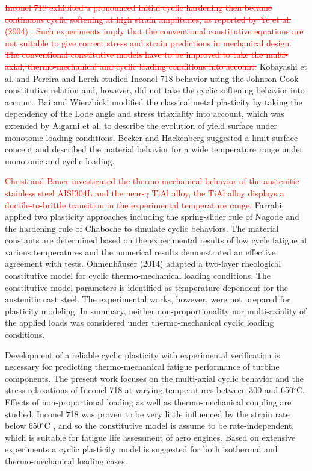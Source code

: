 \documentclass[preprint,5p,twocolumn,11pt,sort&compress]{elsarticle}
\newcommand{\marked}[1]{\textcolor{red}{#1}}
\begin{document}
\marked{\sout{Inconel 718 exhibited a pronounced initial cyclic hardening then became continuous cyclic softening at high strain amplitudes, as reported by  Ye et al. (2004) \cite{ye2004low} . Such experiments imply that the conventional constitutive equations are not suitable to give correct stress and strain predictions in mechanical design. The conventional constitutive models have to be improved to take the multi-axial, thermo-mechanical and cyclic loading conditions into account.}}
Kobayashi et al. \cite{Kobayashi2008389} and Pereira and Lerch  \cite{Pereira2001715} studied  Inconel 718 behavior using the Johnson-Cook constitutive relation and, however, did not take the cyclic softening behavior into account.
Bai and Wierzbicki  \cite{Bai20081071} modified the classical metal plasticity by taking the dependency of the Lode angle and stress triaxiality into account, which was extended by Algarni et al.  \cite{Algarni2015140} to describe the evolution of yield surface under monotonic loading conditions. Becker and Hackenberg \cite{Becker2011596} suggested a limit surface concept and described the material behavior for a wide temperature range under monotonic and cyclic loading.

\marked{\sout{Christ and Bauer \cite{Christ201259} investigated the thermo-mechanical behavior of the austenitic stainless steel AISI304L and the near-$\gamma$ TiAl alloy, the TiAl alloy displays a ductile-to-brittle transition in the experimental temperature range.}}
Farrahi  \cite{Farrahi2014245} applied two plasticity approaches including the spring-slider rule of Nagode and the hardening rule of Chaboche to simulate cyclic behaviors.
The material constants are determined based on the experimental results of low cycle fatigue at various temperatures and
the numerical results demonstrated an effective agreement with tests.
Ohmenh\"{a}user (2014) \cite{Ohmenhauser2014631} adapted a two-layer rheological constitutive model for cyclic thermo-mechanical loading conditions.
The constitutive model parameters is identified as temperature dependent for the austenitic cast steel. The experimental works, however, were not prepared for plasticity modeling. In summary, neither non-proportionality nor multi-axiality of the applied loads was considered under thermo-mechanical cyclic loading conditions.

Development of a reliable cyclic plasticity with experimental verification is necessary for predicting thermo-mechanical fatigue performance of turbine components.
The present work focuses on the  multi-axial cyclic behavior and the stress relaxations of Inconel 718 at varying temperatures between 300 and 650$^{\circ}$C. Effects of non-proportional loading as well as thermo-mechanical coupling are studied. Inconel 718 was proven to be very little influenced by the strain rate below 650$^{\circ}$C \cite{kim1988elevated}\marked{\cite{Schlesinger2017}}, and so the constitutive model is assume to be rate-independent, which is suitable for fatigue life assessment of aero engines. Based on extensive experiments a cyclic plasticity model is suggested for both isothermal and thermo-mechanical loading cases.
\end{document}
